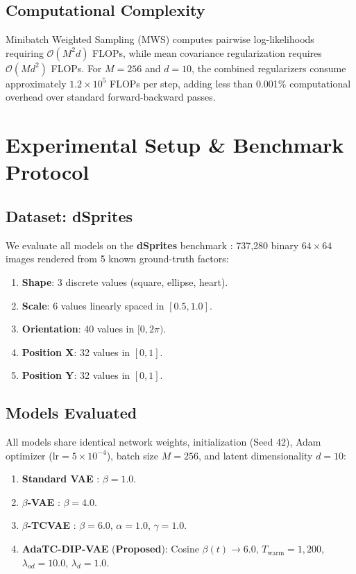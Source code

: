 \documentclass[11pt,a4paper]{article}
\begin{document}
\subsection{Computational Complexity}
Minibatch Weighted Sampling (MWS) computes pairwise log-likelihoods requiring $\mathcal{O}(M^2 d)$ FLOPs, while mean covariance regularization requires $\mathcal{O}(M d^2)$ FLOPs. For $M = 256$ and $d = 10$, the combined regularizers consume approximately $1.2 \times 10^5$ FLOPs per step, adding less than 0.001\% computational overhead over standard forward-backward passes.

\section{Experimental Setup \& Benchmark Protocol}

\subsection{Dataset: dSprites}
We evaluate all models on the \textbf{dSprites} benchmark \cite{dsprites17}: 737,280 binary $64 \times 64$ images rendered from 5 known ground-truth factors:
\begin{enumerate}
    \item \textbf{Shape}: 3 discrete values (square, ellipse, heart).
    \item \textbf{Scale}: 6 values linearly spaced in $[0.5, 1.0]$.
    \item \textbf{Orientation}: 40 values in $[0, 2\pi)$.
    \item \textbf{Position X}: 32 values in $[0, 1]$.
    \item \textbf{Position Y}: 32 values in $[0, 1]$.
\end{enumerate}

\subsection{Models Evaluated}
All models share identical network weights, initialization (Seed 42), Adam optimizer ($\text{lr} = 5 \times 10^{-4}$), batch size $M = 256$, and latent dimensionality $d = 10$:
\begin{enumerate}
    \item \textbf{Standard VAE} \cite{kingma2013auto}: $\beta = 1.0$.
    \item \textbf{$\beta$-VAE} \cite{higgins2017beta}: $\beta = 4.0$.
    \item \textbf{$\beta$-TCVAE} \cite{chen2018isolating}: $\beta = 6.0$, $\alpha = 1.0$, $\gamma = 1.0$.
    \item \textbf{AdaTC-DIP-VAE} (\textbf{Proposed}): Cosine $\beta(t) \to 6.0$, $T_{\text{warm}} = 1,200$, $\lambda_{od} = 10.0$, $\lambda_d = 1.0$.
\end{enumerate}
\end{document}
